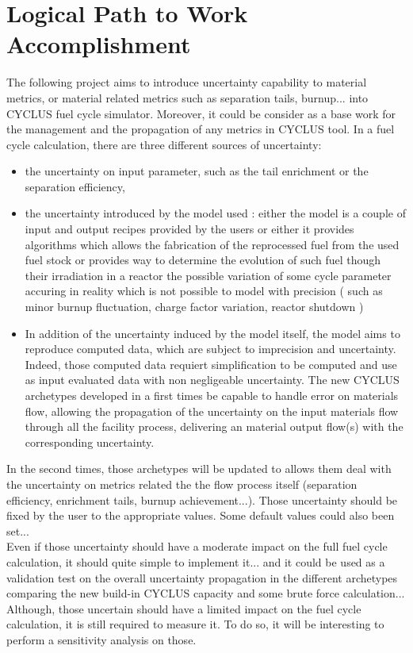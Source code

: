 \documentclass[dvips,12pt]{article}
\begin{document}
\section{Logical Path to Work Accomplishment}

The following project aims to introduce uncertainty capability to material metrics, or material related metrics such as separation tails, burnup...  into CYCLUS fuel cycle simulator. Moreover, it could be consider as a base work for the management and the propagation of any metrics in CYCLUS tool.
In a fuel cycle calculation, there are three different sources of uncertainty:
\begin{itemize}
\item the uncertainty on input parameter, such as the tail enrichment or the separation efficiency,
\item the uncertainty introduced by the model used :  either the model is a couple of input and output recipes provided by the users or either it provides algorithms which allows the fabrication of the reprocessed fuel from the used fuel stock or provides way to determine the evolution of such fuel though their irradiation in a reactor
the possible variation of some cycle parameter accuring in reality which is not possible to model with precision ( such as minor burnup fluctuation, charge factor variation, reactor shutdown )
\item In addition of the uncertainty induced by the model itself, the model aims to reproduce computed data, which are subject to imprecision and uncertainty. Indeed, those computed data requiert simplification to be computed and use as input evaluated data with non negligeable uncertainty.
The new CYCLUS archetypes developed in a first times be capable to handle error on materials flow, allowing the propagation of the uncertainty on the input materials flow through all the facility process, delivering an material output flow(s) with the corresponding uncertainty.
\end{itemize}
In the second times, those archetypes will be updated to allows them deal with the uncertainty on metrics related the the flow process itself (separation efficiency, enrichment tails, burnup achievement...). Those uncertainty should be fixed by the user to the appropriate values. Some default values could also been set...\\
Even if those uncertainty should have a moderate impact on the full fuel cycle calculation, it should quite simple to implement it... and it could be used as a validation test on the overall uncertainty propagation in the different archetypes comparing the new build-in CYCLUS capacity and some brute force calculation...\\
Although, those uncertain should have a limited impact on the fuel cycle calculation, it is still required to measure it. To do so, it will be interesting to perform a sensitivity analysis on those.
\end{document}

